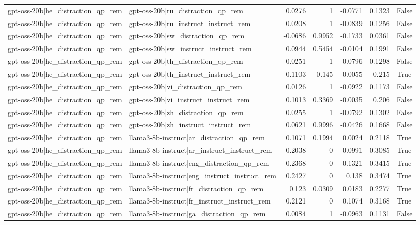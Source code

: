 \begin{table}
\begin{tabular}{l l r r r r l}
gpt-oss-20b|he_distraction_qp_rem & gpt-oss-20b|ru_distraction_qp_rem & 0.0276 & 1 & -0.0771 & 0.1323 & False \\
gpt-oss-20b|he_distraction_qp_rem & gpt-oss-20b|ru_instruct_instruct_rem & 0.0208 & 1 & -0.0839 & 0.1256 & False \\
gpt-oss-20b|he_distraction_qp_rem & gpt-oss-20b|sw_distraction_qp_rem & -0.0686 & 0.9952 & -0.1733 & 0.0361 & False \\
gpt-oss-20b|he_distraction_qp_rem & gpt-oss-20b|sw_instruct_instruct_rem & 0.0944 & 0.5454 & -0.0104 & 0.1991 & False \\
gpt-oss-20b|he_distraction_qp_rem & gpt-oss-20b|th_distraction_qp_rem & 0.0251 & 1 & -0.0796 & 0.1298 & False \\
gpt-oss-20b|he_distraction_qp_rem & gpt-oss-20b|th_instruct_instruct_rem & 0.1103 & 0.145 & 0.0055 & 0.215 & True \\
gpt-oss-20b|he_distraction_qp_rem & gpt-oss-20b|vi_distraction_qp_rem & 0.0126 & 1 & -0.0922 & 0.1173 & False \\
gpt-oss-20b|he_distraction_qp_rem & gpt-oss-20b|vi_instruct_instruct_rem & 0.1013 & 0.3369 & -0.0035 & 0.206 & False \\
gpt-oss-20b|he_distraction_qp_rem & gpt-oss-20b|zh_distraction_qp_rem & 0.0255 & 1 & -0.0792 & 0.1302 & False \\
gpt-oss-20b|he_distraction_qp_rem & gpt-oss-20b|zh_instruct_instruct_rem & 0.0621 & 0.9996 & -0.0426 & 0.1668 & False \\
gpt-oss-20b|he_distraction_qp_rem & llama3-8b-instruct|ar_distraction_qp_rem & 0.1071 & 0.1994 & 0.0024 & 0.2118 & True \\
gpt-oss-20b|he_distraction_qp_rem & llama3-8b-instruct|ar_instruct_instruct_rem & 0.2038 & 0 & 0.0991 & 0.3085 & True \\
gpt-oss-20b|he_distraction_qp_rem & llama3-8b-instruct|eng_distraction_qp_rem & 0.2368 & 0 & 0.1321 & 0.3415 & True \\
gpt-oss-20b|he_distraction_qp_rem & llama3-8b-instruct|eng_instruct_instruct_rem & 0.2427 & 0 & 0.138 & 0.3474 & True \\
gpt-oss-20b|he_distraction_qp_rem & llama3-8b-instruct|fr_distraction_qp_rem & 0.123 & 0.0309 & 0.0183 & 0.2277 & True \\
gpt-oss-20b|he_distraction_qp_rem & llama3-8b-instruct|fr_instruct_instruct_rem & 0.2121 & 0 & 0.1074 & 0.3168 & True \\
gpt-oss-20b|he_distraction_qp_rem & llama3-8b-instruct|ga_distraction_qp_rem & 0.0084 & 1 & -0.0963 & 0.1131 & False \\

\end{tabular}
\end{table}
